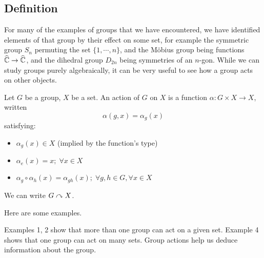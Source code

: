 \subsection{Definition}
For many of the examples of groups that we have encountered, we have identified elements of that group by their effect on some set, for example the symmetric group \(S_n\) permuting the set \(\{ 1, \cdots, n \}\), and the M\"obius group being functions \(\widehat{\mathbb C} \to \widehat{\mathbb C}\), and the dihedral group \(D_{2n}\) being symmetries of an \(n\)-gon.
While we can study groups purely algebraically, it can be very useful to see how a group acts on other objects.

\begin{definition}
	Let \(G\) be a group, \(X\) be a set.
	An action of \(G\) on \(X\) is a function \(\alpha: G \times X \to X\), written
	\[
		\alpha(g, x) = \alpha_g(x)
	\]
	satisfying:
	\begin{itemize}
		\item \(\alpha_g(x) \in X\) (implied by the function's type)
		\item \(\alpha_e(x) = x;\; \forall x \in X\)
		\item \(\alpha_g \circ \alpha_h(x) = \alpha_{gh}(x);\; \forall g, h \in G, \forall x \in X\)
	\end{itemize}
	We can write \(G \curvearrowright X\).
\end{definition}
Here are some examples.
Examples 1, 2 show that more than one group can act on a given set.
Example 4 shows that one group can act on many sets.
Group actions help us deduce information about the group.

